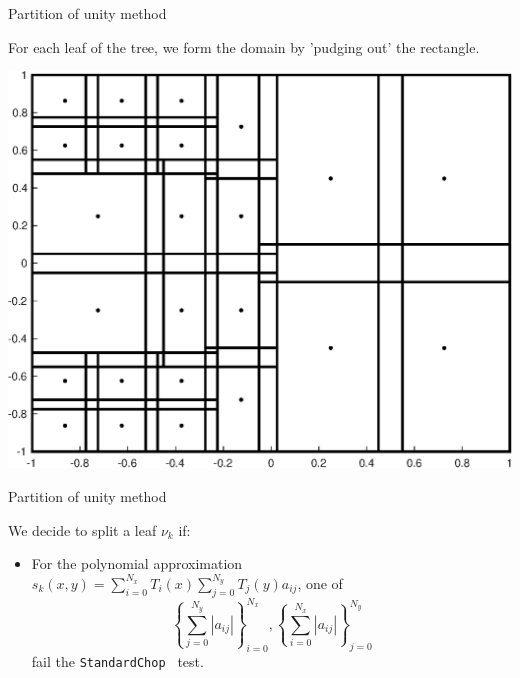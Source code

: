\documentclass{beamer}
\begin{document}
\begin{frame}{Partition of unity method}
\begin{center}
For each leaf of the tree, we form the domain by 'pudging out' the rectangle.
\end{center}

\begin{center}
\includegraphics[scale = 0.4]{domainPlot.eps}
\end{center}
\end{frame}

\begin{frame}{Partition of unity method}
\begin{center}
We decide to split a leaf $\nu_k$ if:
\end{center}
\begin{itemize}
\item For the polynomial approximation $s_k(x,y)=\sum_{i=0}^{N_x} T_i(x) \sum_{j=0}^{N_y} T_j(y)a_{ij}$, one of $$ \left \{ \sum_{j=0}^{N_y} |a_{ij}|  \right \}_{i=0}^{N_x}, \left \{ \sum_{i=0}^{N_x} |a_{ij}|  \right \}_{j=0}^{N_y} $$ fail the { \tt StandardChop } test.
\end{itemize}

\end{frame}
\end{document}
